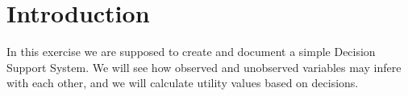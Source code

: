 \section{Introduction}
In this exercise we are supposed to create and document a simple Decision
Support System. We will see how observed and unobserved variables may infere
with each other, and we will calculate utility values based on decisions.
